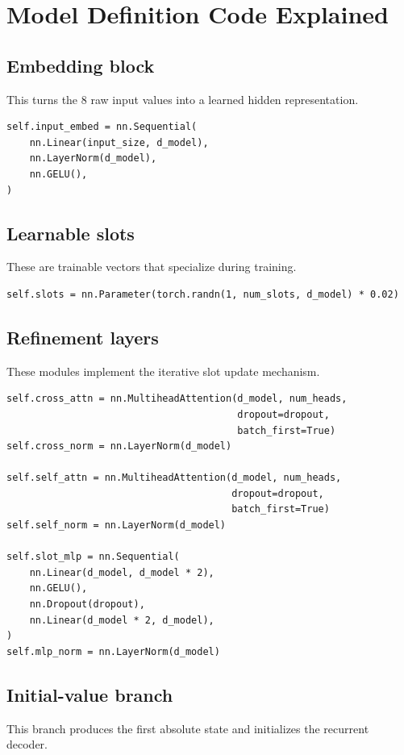\documentclass[11pt,a4paper]{article}
\begin{document}
\section{Model Definition Code Explained}

\subsection*{Embedding block}
This turns the 8 raw input values into a learned hidden representation.

\begin{lstlisting}
self.input_embed = nn.Sequential(
    nn.Linear(input_size, d_model),
    nn.LayerNorm(d_model),
    nn.GELU(),
)
\end{lstlisting}

\subsection*{Learnable slots}
These are trainable vectors that specialize during training.

\begin{lstlisting}
self.slots = nn.Parameter(torch.randn(1, num_slots, d_model) * 0.02)
\end{lstlisting}

\subsection*{Refinement layers}
These modules implement the iterative slot update mechanism.

\begin{lstlisting}
self.cross_attn = nn.MultiheadAttention(d_model, num_heads,
                                        dropout=dropout,
                                        batch_first=True)
self.cross_norm = nn.LayerNorm(d_model)

self.self_attn = nn.MultiheadAttention(d_model, num_heads,
                                       dropout=dropout,
                                       batch_first=True)
self.self_norm = nn.LayerNorm(d_model)

self.slot_mlp = nn.Sequential(
    nn.Linear(d_model, d_model * 2),
    nn.GELU(),
    nn.Dropout(dropout),
    nn.Linear(d_model * 2, d_model),
)
self.mlp_norm = nn.LayerNorm(d_model)
\end{lstlisting}

\subsection*{Initial-value branch}
This branch produces the first absolute state and initializes the recurrent decoder.
\end{document}
